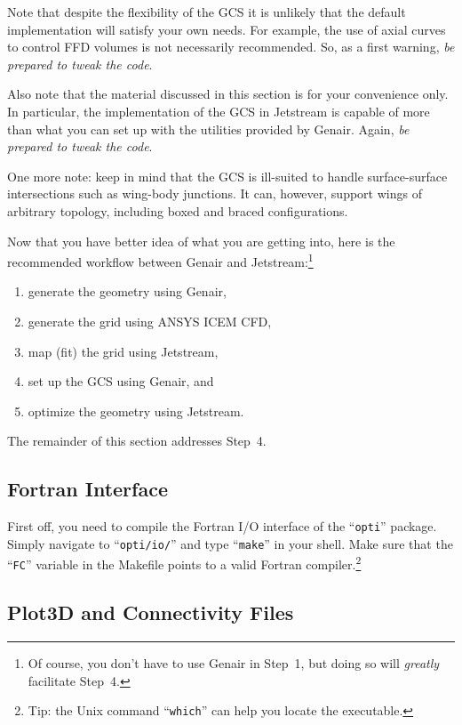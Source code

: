 \documentclass[]{article}
\begin{document}
Note that despite the flexibility of the GCS it is unlikely that the 
default implementation will satisfy your own needs.  For example, the 
use of axial curves to control FFD volumes is not necessarily 
recommended.  So, as a first warning, \emph{be prepared to tweak the 
code}.

Also note that the material discussed in this section is for your 
convenience only.  In particular, the implementation of the GCS in 
Jetstream is capable of more than what you can set up with the utilities 
provided by Genair.  Again, \emph{be prepared to tweak the code}.

One more note: keep in mind that the GCS is ill-suited to handle 
surface-surface intersections such as wing-body junctions.  It can, 
however, support wings of arbitrary topology, including boxed and braced 
configurations.

Now that you have better idea of what you are getting into, here is the 
recommended workflow between Genair and Jetstream:\footnote{Of course, 
you don't have to use Genair in Step~1, but doing so will \emph{greatly} 
facilitate Step~4.}
\begin{enumerate}
  \item generate the geometry using Genair,
  \item generate the grid using ANSYS ICEM CFD,
  \item map (fit) the grid using Jetstream,
  \item set up the GCS using Genair, and
  \item optimize the geometry using Jetstream.
\end{enumerate}
The remainder of this section addresses Step~4.

\subsection{Fortran Interface}

First off, you need to compile the Fortran I/O interface of the 
``\texttt{opti}'' package.  Simply navigate to ``\texttt{opti/io/}'' and 
type ``\texttt{make}'' in your shell.  Make sure that the 
``\texttt{FC}'' variable in the Makefile points to a valid Fortran 
compiler.\footnote{Tip: the Unix command ``\texttt{which}'' can help you 
locate the executable.}

\subsection{Plot3D and Connectivity Files}
\end{document}
